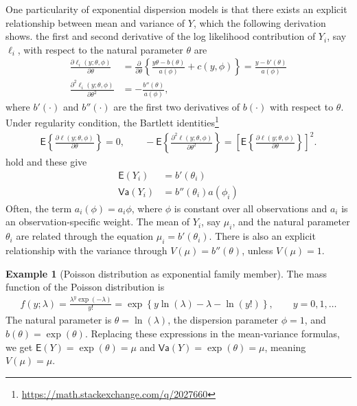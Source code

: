 \documentclass[
  11pt,
  letterpaper,
]{book}
\renewcommand{\href}[2]{#2\footnote{\url{#1}}}
\theoremstyle{definition}
\theoremstyle{definition}
\newtheorem{example}{Example}[chapter]
\theoremstyle{definition}
\theoremstyle{definition}
\theoremstyle{remark}
\begin{document}
One particularity of exponential dispersion models is that there exists
an explicit relationship between mean and variance of \(Y\), which the
following derivation shows. the first and second derivative of the log
likelihood contribution of \(Y_i\), say \(\ell_i\), with respect to the
natural parameter \(\theta\) are
\begin{align*}
\frac{\partial \ell_i(y; \theta, \phi)}{\partial \theta} &= \frac{\partial}{\partial \theta} \left\{\frac{y\theta-b(\theta)}{a(\phi)} + c(y, \phi) \right\} = \frac{y - b'(\theta)}{a(\phi)}\\
\frac{\partial^2 \ell_i(y; \theta, \phi)}{\partial \theta^2} &= - \frac{b''(\theta)}{a(\phi)},
\end{align*}
where \(b'(\cdot)\) and \(b''(\cdot)\) are the first two
derivatives of \(b(\cdot)\) with respect to \(\theta\). Under regularity
condition, the \href{https://math.stackexchange.com/q/2027660}{Bartlett identities}
\begin{align*}
\mathsf{E}\left\{\frac{\partial \ell(y; \theta, \phi)}{\partial \theta}\right\}=0, \qquad - \mathsf{E}\left\{\frac{\partial^2 \ell(y; \theta, \phi)}{\partial \theta^2}\right\} = \left[\mathsf{E}\left\{\frac{\partial \ell(y; \theta, \phi)}{\partial \theta}\right\}\right]^2.
\end{align*}
hold and these give
\begin{align*}
\mathsf{E}(Y_i) &= b'(\theta_i) \\
\mathsf{Va}(Y_i) &= b''(\theta_i)a(\phi_i)
\end{align*}
Often, the term \(a_i(\phi)=a_i\phi\), where \(\phi\) is
constant over all observations and \(a_i\) is an observation-specific
weight. The mean of \(Y_i\), say \(\mu_i\), and the natural parameter
\(\theta_i\) are related through the equation \(\mu_i=b'(\theta_i)\). There
is also an explicit relationship with the variance through
\(V(\mu)=b''(\theta)\), unless \(V(\mu)=1\).

\begin{example}[Poisson distribution as exponential family member]
\protect\hypertarget{exm:poissonglmexpf}{}{\label{exm:poissonglmexpf} {} }The mass function of the Poisson distribution is
\begin{align*}
f(y; \lambda) = \frac{\lambda^y \exp(-\lambda)}{y!} =\exp \left\{ y \ln
(\lambda) -\lambda-\ln(y!)\right\}, \qquad y=0,1, \ldots
\end{align*}
The natural parameter is \(\theta =\ln(\lambda)\), the dispersion
parameter \(\phi=1\), and \(b(\theta)=\exp(\theta)\). Replacing these expressions in the mean-variance formulas, we get \(\mathsf{E}(Y)=\exp(\theta)=\mu\) and \(\mathsf{Va}(Y)=\exp(\theta)=\mu\), meaning \(V(\mu)=\mu\).
\end{example}
\end{document}
